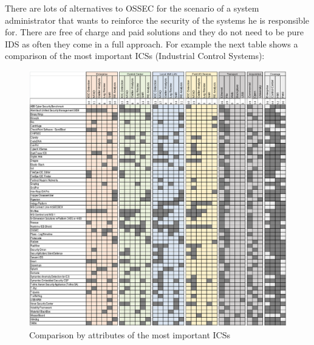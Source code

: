 \linej
There are lots of alternatives to OSSEC for the scenario of a system administrator that wants to reinforce the security of the systems he is responsible for. There are free of charge and paid solutions and they do not need to be pure IDS as often they come in a full approach. For example the next table shows a comparison of the most important ICSs (Industrial Control Systems):
\begin{figure}[H]
  \centering
	\includegraphics[width=\textwidth]{figuras/comparison_ics.png}
	\caption{Comparison by attributes of the most important ICSs\cite{comparison_ics}}
\end{figure}

